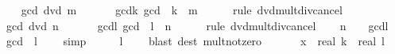 \begin{isabellebody}
\ \ \isamarkupfalse%
\ {\isachardoublequoteopen}{\isacharquery}{\kern0pt}gcd\ dvd\ m{\isachardoublequoteclose}\ \isacommand{{\isachardot}{\kern0pt}{\isachardot}{\kern0pt}}\isamarkupfalse%
\isanewline
\ \ \isamarkupfalse%
\ \isamarkupfalse%
\ gcd{\isacharunderscore}{\kern0pt}k{\isacharcolon}{\kern0pt}\ {\isachardoublequoteopen}{\isacharquery}{\kern0pt}gcd\ {\isacharasterisk}{\kern0pt}\ {\isacharquery}{\kern0pt}k\ {\isacharequal}{\kern0pt}\ m{\isachardoublequoteclose}\isanewline
\ \ \ \ \isamarkupfalse%
\ {\isacharparenleft}{\kern0pt}rule\ dvd{\isacharunderscore}{\kern0pt}mult{\isacharunderscore}{\kern0pt}div{\isacharunderscore}{\kern0pt}cancel{\isacharparenright}{\kern0pt}\isanewline
\ \ \isamarkupfalse%
\ {\isachardoublequoteopen}{\isacharquery}{\kern0pt}gcd\ dvd\ n{\isachardoublequoteclose}\ \isacommand{{\isachardot}{\kern0pt}{\isachardot}{\kern0pt}}\isamarkupfalse%
\isanewline
\ \ \isamarkupfalse%
\ \isamarkupfalse%
\ gcd{\isacharunderscore}{\kern0pt}l{\isacharcolon}{\kern0pt}\ {\isachardoublequoteopen}{\isacharquery}{\kern0pt}gcd\ {\isacharasterisk}{\kern0pt}\ {\isacharquery}{\kern0pt}l\ {\isacharequal}{\kern0pt}\ n{\isachardoublequoteclose}\isanewline
\ \ \ \ \isamarkupfalse%
\ {\isacharparenleft}{\kern0pt}rule\ dvd{\isacharunderscore}{\kern0pt}mult{\isacharunderscore}{\kern0pt}div{\isacharunderscore}{\kern0pt}cancel{\isacharparenright}{\kern0pt}\isanewline
\ \ \isamarkupfalse%
\ {\isacartoucheopen}n\ {\isasymnoteq}\ {}{\isacartoucheclose}\ \ gcd{\isacharunderscore}{\kern0pt}l\ \isamarkupfalse%
\ {\isachardoublequoteopen}{\isacharquery}{\kern0pt}gcd\ {\isacharasterisk}{\kern0pt}\ {\isacharquery}{\kern0pt}l\ {\isasymnoteq}\ {}{\isachardoublequoteclose}\ \isamarkupfalse%
\ simp\isanewline
\ \ \isamarkupfalse%
\ \isamarkupfalse%
\ {\isachardoublequoteopen}{\isacharquery}{\kern0pt}l\ {\isasymnoteq}\ {}{\isachardoublequoteclose}\ \isamarkupfalse%
\ {\isacharparenleft}{\kern0pt}blast\ dest{\isacharbang}{\kern0pt}{\isacharcolon}{\kern0pt}\ mult{\isacharunderscore}{\kern0pt}not{\isacharunderscore}{\kern0pt}zero{\isacharparenright}{\kern0pt}\isanewline
\ \ \isamarkupfalse%
\isanewline
\ \ \isamarkupfalse%
\ {\isachardoublequoteopen}{\isasymbar}x{\isasymbar}\ {\isacharequal}{\kern0pt}\ real\ {\isacharquery}{\kern0pt}k\ {\isacharslash}{\kern0pt}\ real\ {\isacharquery}{\kern0pt}l{\isachardoublequoteclose}\isanewline

\end{isabellebody}
